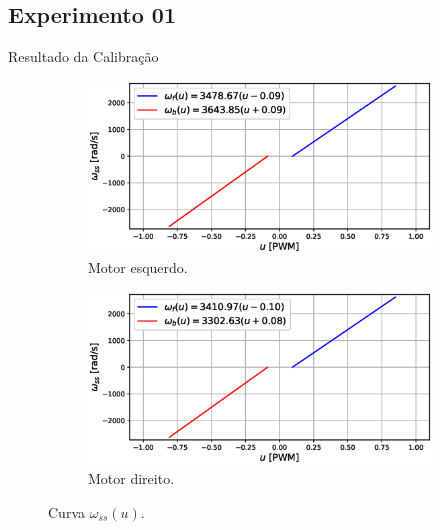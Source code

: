 \subsection{Experimento 01}
\begin{frame}{Resultado da Calibração}

\begin{figure}
    \begin{subfigure}{.45\textwidth}
    \centering
        \includegraphics[width=\textwidth]{figuras/resultados/exp01/curva_feedforward_esquerdo100.eps}
        \caption{Motor esquerdo.}
    \end{subfigure}
    \begin{subfigure}{.45\textwidth}
        \centering
        \includegraphics[width=\textwidth]{figuras/resultados/exp01/curva_feedforward_direito100.eps}
        \caption{Motor direito.}
    \end{subfigure}
    \caption{Curva $\omega_{ss}(u)$.}
\end{figure}

\end{frame}

